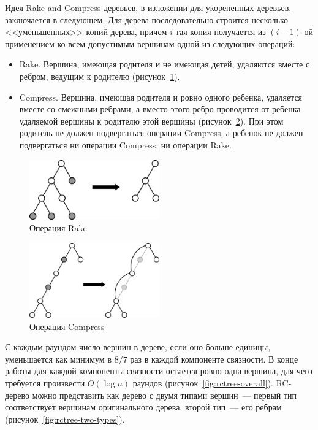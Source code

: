 \documentclass[specification,annotation]{itmo-student-thesis}
\begin{document}
Идея Rake-and-Compress деревьев, в изложении для укорененных деревьев, заключается в следующем. Для дерева последовательно строится несколько <<уменьшенных>> копий дерева, причем $i$-тая копия получается
из $(i-1)$-ой применением ко всем допустимым вершинам одной из следующих операций:
\begin{itemize}
    \item Rake. Вершина, имеющая родителя и не имеющая детей, удаляются вместе с ребром, ведущим к родителю (рисунок~\ref{fig:rake}).
    \item Compress. Вершина, имеющая родителя и ровно одного ребенка, удаляется вместе со смежными ребрами, а вместо этого ребро проводится от ребенка удаляемой вершины к родителю этой вершины
          (рисунок~\ref{fig:compress}). При этом родитель не должен подвергаться операции Compress, а ребенок не должен подвергаться ни операции Compress, ни операции Rake.
\end{itemize}

\begin{figure}[!ht]
\centering
\includegraphics[width=0.5\textwidth]{pic/rake.png}
\caption{Операция Rake}\label{fig:rake}
\end{figure}
\begin{figure}[!ht]
\centering
\includegraphics[width=0.5\textwidth]{pic/compress.png}
\caption{Операция Compress}\label{fig:compress}
\end{figure}

С каждым раундом число вершин в дереве, если оно больше единицы, уменьшается как минимум в $8/7$ раз в каждой компоненте связности. В конце работы для каждой компоненты связности
остается ровно одна вершина, для чего требуется произвести $O(\log n)$ раундов (рисунок~\ref{fig:rctree-overall}). RC-дерево можно представить как дерево с двумя типами вершин~--- первый тип соответствует 
вершинам оригинального дерева, второй тип~--- его ребрам (рисунок~\ref{fig:rctree-two-types}).
\end{document}
